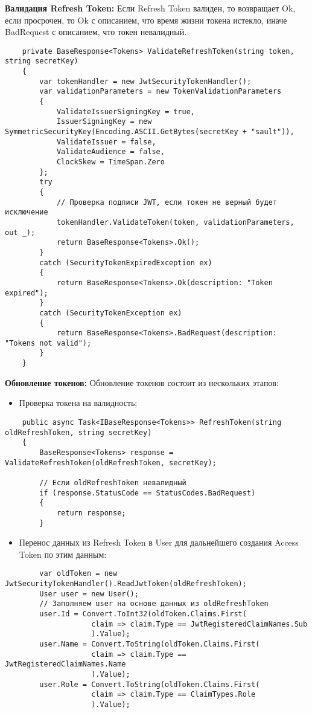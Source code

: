 \textbf{Валидация Refresh Token:} Если Refresh Token валиден, то возвращает Ok, если просрочен, то Ok с описанием, что время жизни токена истекло, иначе BadRequest с описанием, что токен невалидный.
\begin{verbatim}
    private BaseResponse<Tokens> ValidateRefreshToken(string token, string secretKey)
    {
        var tokenHandler = new JwtSecurityTokenHandler();
        var validationParameters = new TokenValidationParameters
        {
            ValidateIssuerSigningKey = true,
            IssuerSigningKey = new SymmetricSecurityKey(Encoding.ASCII.GetBytes(secretKey + "sault")),
            ValidateIssuer = false,
            ValidateAudience = false,
            ClockSkew = TimeSpan.Zero
        };
        try
        {
            // Проверка подписи JWT, если токен не верный будет исключение
            tokenHandler.ValidateToken(token, validationParameters, out _);
            return BaseResponse<Tokens>.Ok();
        }
        catch (SecurityTokenExpiredException ex)
        {
            return BaseResponse<Tokens>.Ok(description: "Token expired");
        }
        catch (SecurityTokenException ex)
        {
            return BaseResponse<Tokens>.BadRequest(description: "Tokens not valid");
        }
    }
\end{verbatim}

\textbf{Обновление токенов:} Обновление токенов состоит из нескольких этапов:
\begin{itemize}
	\item{Проверка токена на валидность;}
\end{itemize}
\begin{verbatim}
    public async Task<IBaseResponse<Tokens>> RefreshToken(string oldRefreshToken, string secretKey)
    {
        BaseResponse<Tokens> response = ValidateRefreshToken(oldRefreshToken, secretKey);

        // Если oldRefreshToken невалидный
        if (response.StatusCode == StatusCodes.BadRequest)
        {
            return response;
        }
\end{verbatim}

\begin{itemize}
	\item{Перенос данных из Refresh Token в User для дальнейшего создания Access Token по этим данным:}
\end{itemize}
\begin{verbatim}
        var oldToken = new JwtSecurityTokenHandler().ReadJwtToken(oldRefreshToken);
        User user = new User();
        // Заполняем user на основе данных из oldRefreshToken
        user.Id = Convert.ToInt32(oldToken.Claims.First(
                    claim => claim.Type == JwtRegisteredClaimNames.Sub
                    ).Value);
        user.Name = Convert.ToString(oldToken.Claims.First(
                    claim => claim.Type == JwtRegisteredClaimNames.Name
                    ).Value);
        user.Role = Convert.ToString(oldToken.Claims.First(
                    claim => claim.Type == ClaimTypes.Role
                    ).Value);
\end{verbatim}

